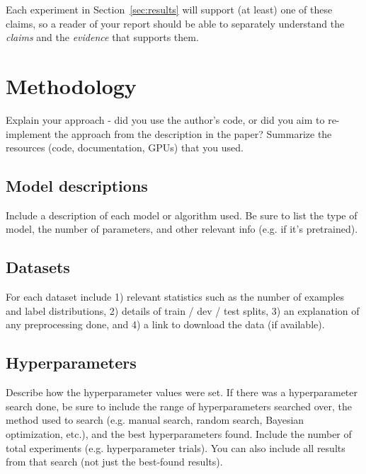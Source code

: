 Each experiment in Section~\ref{sec:results} will support (at least) one of these claims, so a reader of your report should be able to separately understand the \emph{claims} and the \emph{evidence} that supports them.


\section{Methodology}
Explain your approach - did you use the author's code, or did you aim to re-implement the approach from the description in the paper? Summarize the resources (code, documentation, GPUs) that you used.

\subsection{Model descriptions}
Include a description of each model or algorithm used. Be sure to list the type of model, the number of parameters, and other relevant info (e.g. if it's pretrained). 

\subsection{Datasets}
For each dataset include 1) relevant statistics such as the number of examples and label distributions, 2) details of train / dev / test splits, 3) an explanation of any preprocessing done, and 4) a link to download the data (if available).

\subsection{Hyperparameters}
Describe how the hyperparameter values were set. If there was a hyperparameter search done, be sure to include the range of hyperparameters searched over, the method used to search (e.g. manual search, random search, Bayesian optimization, etc.), and the best hyperparameters found. Include the number of total experiments (e.g. hyperparameter trials). You can also include all results from that search (not just the best-found results).

